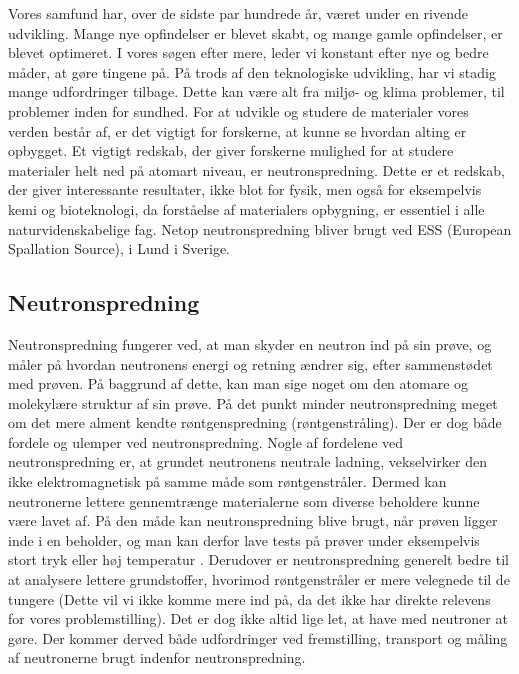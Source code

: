 \documentclass[12pt,oneside,a4paper]{article}
\begin{document}
{{{{{Vores samfund har, over de sidste par hundrede år, været under en rivende udvikling. Mange nye opfindelser er blevet skabt, og mange gamle opfindelser, er blevet optimeret. I vores søgen efter mere, leder vi konstant efter nye og bedre måder, at gøre tingene på. På trods af den teknologiske udvikling, har vi stadig mange udfordringer tilbage. Dette kan være alt fra miljø- og klima problemer, til problemer inden for sundhed. For at udvikle og studere de materialer vores verden består af, er det vigtigt for forskerne, at kunne se hvordan alting er opbygget. Et vigtigt redskab, der giver forskerne mulighed for at studere materialer helt ned på atomart niveau, er neutronspredning. Dette er et redskab, der giver interessante resultater, ikke blot for fysik, men også for eksempelvis kemi og bioteknologi, da forståelse af materialers opbygning, er essentiel i alle naturvidenskabelige fag. Netop neutronspredning bliver brugt ved ESS (European Spallation Source), i Lund i Sverige. \cite{ess_folder}

\subsection{Neutronspredning}
Neutronspredning fungerer ved, at man skyder en neutron ind på sin prøve, og måler på hvordan neutronens energi og retning ændrer sig, efter sammenstødet med prøven. På baggrund af dette, kan man sige noget om den atomare og molekylære struktur af sin prøve. På det punkt minder neutronspredning meget om det mere alment kendte røntgenspredning (røntgenstråling). Der er dog både fordele og ulemper ved neutronspredning. Nogle af fordelene ved neutronspredning er, at grundet neutronens neutrale ladning, vekselvirker den ikke elektromagnetisk på samme måde som røntgenstråler. Dermed kan neutronerne lettere gennemtrænge materialerne som diverse beholdere kunne være lavet af. På den måde kan neutronspredning blive brugt, når prøven ligger inde i en beholder, og man kan derfor lave tests på prøver under eksempelvis stort tryk eller høj temperatur . Derudover er neutronspredning generelt bedre til at analysere lettere grundstoffer, hvorimod røntgenstråler er mere velegnede til de tungere (Dette vil vi ikke komme mere ind på, da det ikke har direkte relevens for vores problemstilling). Det er dog ikke altid lige let, at have med neutroner at gøre. Der kommer derved både udfordringer ved fremstilling, transport og måling af neutronerne brugt indenfor neutronspredning.

}}}}}
\end{document}
